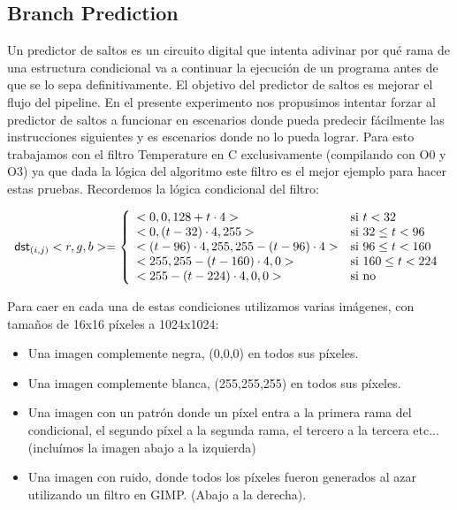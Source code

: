 \subsection{Branch Prediction}

Un predictor de saltos es un circuito digital que intenta adivinar por qué rama de una estructura condicional va a continuar la ejecución de un programa antes de que se lo sepa definitivamente. El objetivo del predictor de saltos es mejorar el flujo del pipeline. En el presente experimento nos propusimos intentar forzar al predictor de saltos a funcionar en escenarios donde pueda predecir fácilmente las instrucciones siguientes y es escenarios donde no lo pueda lograr. Para esto trabajamos con el filtro Temperature en C exclusivamente (compilando con O0 y O3) ya que dada la lógica del algoritmo este filtro es el mejor ejemplo para hacer estas pruebas. Recordemos la lógica condicional del filtro:
\begin{center}
	\begin{displaymath}
	\mathsf{dst}_{(i,j)}<r,g,b> = \left\{
	\begin{array}{l l}
				<0,0, 128 + t \cdot 4> & \text{si }t < 32\\
				<0, (t - 32) \cdot 4, 255> & \text{si }32 \le t < 96\\
				<(t-96) \cdot 4, 255, 255 - (t-96) \cdot 4> & \text{si }96 \le t < 160\\
				<255, 255 - (t - 160) \cdot 4, 0> & \text{si }160 \le t < 224\\
				<255 - (t - 224) \cdot 4, 0 , 0> & \text{si no} \\
	\end{array}
	\right.
	\end{displaymath}
	\end{center}

Para caer en cada una de estas condiciones utilizamos varias imágenes, con tamaños de 16x16 píxeles a 1024x1024:

\begin{itemize}
	\item Una imagen complemente negra, (0,0,0) en todos sus píxeles.
	\item Una imagen complemente blanca, (255,255,255) en todos sus píxeles.
	\item Una imagen con un patrón donde un píxel entra a la primera rama del condicional, el segundo píxel a la segunda rama, el tercero a la tercera etc... (incluímos la imagen abajo a la izquierda)
	\item Una imagen con ruido, donde todos los píxeles fueron generados al azar utilizando un filtro en GIMP. (Abajo a la derecha).
\end{itemize}

